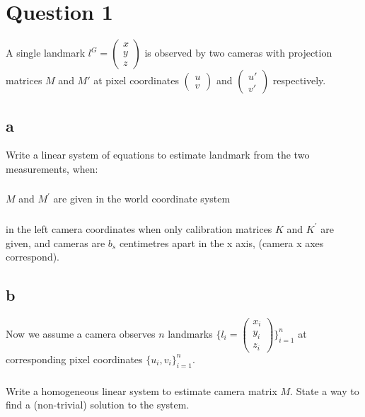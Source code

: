 \documentclass[a4paper]{scrreprt}
\begin{document}
\chapter{Question 1}
A single landmark $l^G=\begin{pmatrix}
x\\y\\z
\end{pmatrix}$ is observed by two cameras with projection matrices $M$ and 
$M'$ at pixel coordinates $\begin{pmatrix}
u \\v
\end{pmatrix}$ and $\begin{pmatrix}
u' \\v'
\end{pmatrix}$ respectively. 
\section{a}
Write a linear system of equations to estimate 
landmark from the two measurements, when:
\subsection{}
$M$ and $M^\prime$ are given in the world coordinate system
\subsection{}
in the left camera coordinates when only calibration matrices $K$ and 
$K^\prime$ are given, and cameras are $b_s$ centimetres apart in the x axis, 
(camera x axes correspond). 

\section{b}
Now we assume a camera observes $n$ landmarks $\{l_i = \begin{pmatrix}
x_i\\y_i\\z_i
\end{pmatrix}\}_{i=1}^n$ at corresponding pixel coordinates $\{u_i, 
v_i\}_{i=1}^n$. 

\subsection{}
Write a homogeneous linear system to estimate camera matrix 
$M$. State a way to find a (non-trivial) solution to the system. 
\end{document}
